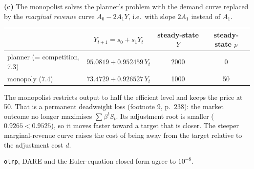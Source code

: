 \documentclass[12pt, letterpaper]{article}
\begin{document}
\begin{tcolorbox}[evenbox,title={Exercise 7.4 \quad Monopoly}]
\textbf{(c)} The monopolist solves the planner's problem with the demand curve replaced by the
\emph{marginal revenue} curve $A_0-2A_1Y$, i.e.\ with slope $2A_1$ instead of $A_1$.
\begin{center}
\begin{tabular}{@{}lccc@{}}
\toprule
& $Y_{t+1}=s_0+s_1Y_t$ & steady-state $Y$ & steady-state $p$ \\
\midrule
planner (= competition, 7.3) & $95.0819+0.952459\,Y_t$ & 2000 & 0 \\
monopoly (7.4) & $73.4729+0.926527\,Y_t$ & 1000 & 50 \\
\bottomrule
\end{tabular}
\end{center}
The monopolist restricts output to half the efficient level and keeps the price at 50. That is a
permanent deadweight loss (footnote 9, p.~238): the market outcome no longer maximises
$\sum\beta^tS_t$. Its adjustment root is smaller ($0.9265<0.9525$), so it moves faster toward a
target that is closer. The steeper marginal-revenue curve raises the cost of being away from the
target relative to the adjustment cost $d$.

\begin{tcolorbox}[databox]
\texttt{olrp}, DARE and the Euler-equation closed form agree to $10^{-8}$.
\end{tcolorbox}
\end{tcolorbox}
\end{document}
